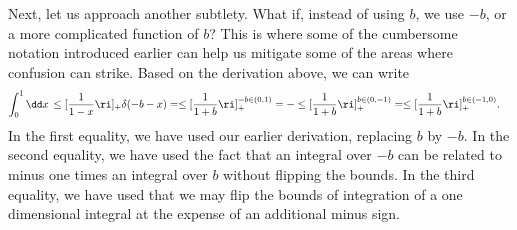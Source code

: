 

Next, let us approach another subtlety.
%
What if, instead of using \(b\), we use \(-b\), or a more complicated function of \(b\)?
%
This is where some of the cumbersome notation introduced earlier can help us mitigate some of the areas where confusion can strike.
%
Based on the derivation above, we can write
\begin{align}
    \int_{0}^{1} \dd x\,\le[\frac{1}{1-x}\ri]_+ \delta(-b - x)
    &=
    \le[\frac{1}{1+b}\ri]_+^{-b\in(0,1)}
    =
    -\le[\frac{1}{1+b}\ri]_+^{b\in(0, -1)}
    =
    \le[\frac{1}{1+b}\ri]_+^{b\in(-1, 0)}
    .
\end{align}
In the first equality, we have used our earlier derivation, replacing \(b\) by \(-b\).
%
In the second equality, we have used the fact that an integral over \(-b\) can be related to minus one times an integral over \(b\) without flipping the bounds.
%
In the third equality, we have used that we may flip the bounds of integration of a one dimensional integral at the expense of an additional minus sign.


